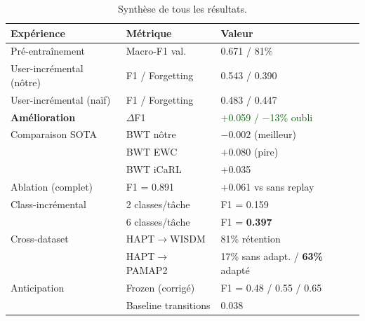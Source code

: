 \documentclass[12pt, a4paper]{article}
\begin{document}
\begin{table}[h]
\centering
\caption{Synthèse de tous les résultats.}
\begin{tabular}{lll}
\toprule
\textbf{Expérience} & \textbf{Métrique} & \textbf{Valeur} \\
\midrule
Pré-entraînement        & Macro-F1 val.  & 0.671 / 81\% \\
\midrule
User-incrémental (nôtre)& F1 / Forgetting & 0.543 / 0.390 \\
User-incrémental (naïf) & F1 / Forgetting & 0.483 / 0.447 \\
\textbf{Amélioration}   & $\Delta$F1      & \textcolor{darkgreen}{$+$0.059 / $-$13\% oubli} \\
\midrule
Comparaison SOTA        & BWT nôtre       & $\mathbf{-0.002}$ (meilleur) \\
                        & BWT EWC         & $+$0.080 (pire) \\
                        & BWT iCaRL       & $+$0.035 \\
\midrule
Ablation (complet)      & F1 = 0.891      & $+$0.061 vs sans replay \\
\midrule
Class-incrémental       & 2 classes/tâche & F1 = 0.159 \\
                        & 6 classes/tâche & F1 = \textbf{0.397} \\
\midrule
Cross-dataset           & HAPT$\to$WISDM  & 81\% rétention \\
                        & HAPT$\to$PAMAP2 & 17\% sans adapt. / \textbf{63\%} adapté \\
\midrule
Anticipation            & Frozen (corrigé) & F1 = 0.48 / 0.55 / 0.65 \\
                        & Baseline transitions & 0.038 \\
\bottomrule
\end{tabular}
\end{table}
\end{document}
